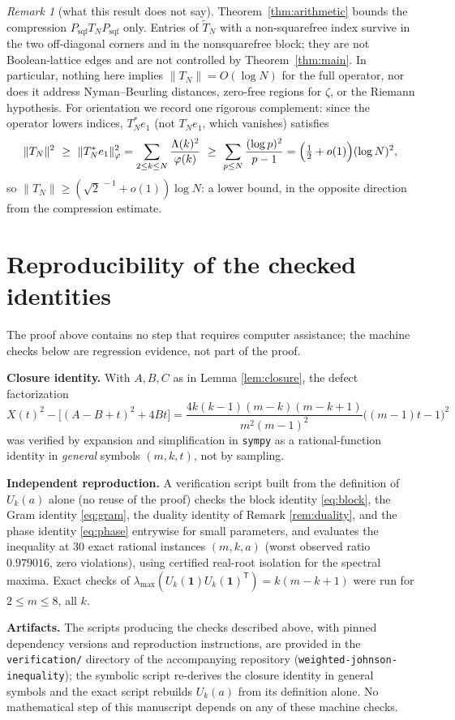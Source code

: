 \documentclass[11pt]{article}
\theoremstyle{remark}
\newtheorem{remark}{Remark}
\begin{document}
\begin{remark}[what this result does not say]\label{rem:not}
Theorem~\ref{thm:arithmetic} bounds the compression
$P_{\mathrm{sqf}}T_NP_{\mathrm{sqf}}$ only. Entries of $\widetilde T_N$
with a non-squarefree index survive in the two off-diagonal corners and
in the nonsquarefree block; they are not Boolean-lattice edges and are
not controlled by Theorem~\ref{thm:main}. In particular, nothing here
implies $\|T_N\|=O(\log N)$ for the full operator, nor does it address
Nyman--Beurling distances, zero-free regions for $\zeta$, or the Riemann
hypothesis. For orientation we record one rigorous complement: since the
operator lowers indices, $T_N^{*}e_1$ (not $T_Ne_1$, which vanishes)
satisfies
\[
\|T_N\|^2\ \ge\ \|T_N^{*}e_1\|_\varphi^2
=\sum_{2\le k\le N}\frac{\Lambda(k)^2}{\varphi(k)}
\ \ge\ \sum_{p\le N}\frac{(\log p)^2}{p-1}
=\Bigl(\tfrac12+o(1)\Bigr)(\log N)^2 ,
\]
so $\|T_N\|\ge(\sqrt2^{\,-1}+o(1))\log N$: a lower bound, in the opposite
direction from the compression estimate.
\end{remark}

\section{Reproducibility of the checked identities}\label{app:repro}

The proof above contains no step that requires computer assistance; the
machine checks below are regression evidence, not part of the proof.

\textbf{Closure identity.} With $A,B,C$ as in Lemma \ref{lem:closure}, the
defect factorization
\[
X(t)^2-\bigl[(A-B+t)^2+4Bt\bigr]
=\frac{4k(k-1)(m-k)(m-k+1)}{m^2(m-1)^2}\bigl((m-1)t-1\bigr)^2
\]
was verified by expansion and simplification in \texttt{sympy} as a
rational-function identity in \emph{general} symbols $(m,k,t)$, not by
sampling.

\textbf{Independent reproduction.} A verification script built from the
definition of $U_k(a)$ alone (no reuse of the proof) checks the block
identity \eqref{eq:block}, the Gram identity \eqref{eq:gram}, the duality
identity of Remark \ref{rem:duality}, and the phase identity
\eqref{eq:phase} entrywise for small parameters, and evaluates the
inequality at $30$ exact rational instances $(m,k,a)$ (worst observed
ratio $0.979016$, zero violations), using certified real-root isolation
for the spectral maxima. Exact checks of $\lambda_{\max}(U_k(\mathbf 1)
U_k(\mathbf 1)^{\mathsf T})=k(m-k+1)$ were run for $2\le m\le 8$, all $k$.

\textbf{Artifacts.} The scripts producing the checks described above,
with pinned dependency versions and reproduction instructions, are
provided in the \texttt{verification/} directory of the accompanying
repository (\texttt{weighted-johnson-inequality}); the symbolic script
re-derives the closure identity in general symbols and the exact script
rebuilds $U_k(a)$ from its definition alone. No mathematical step of this
manuscript depends on any of these machine checks.
\end{document}
